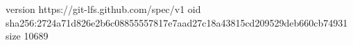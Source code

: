 version https://git-lfs.github.com/spec/v1
oid sha256:2724a71d826e2b6c08855557817e7aad27c18a43815cd209529deb660cb74931
size 10689
